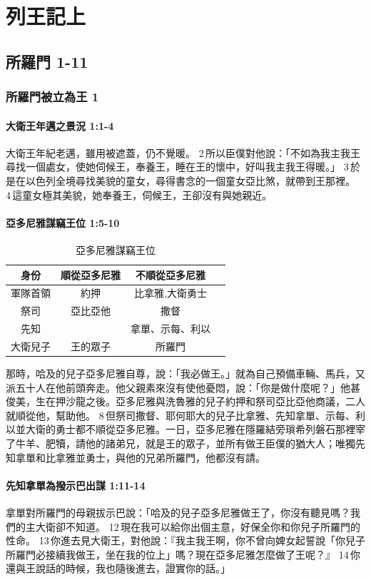 \chapter{列王記上}
\section{所羅門 1-11}


\subsection{所羅門被立為王 1}
\subsubsection{大衛王年邁之景況 1:1-4}
大衛王年紀老邁，雖用被遮蓋，仍不覺暖。 2 所以臣僕對他說：「不如為我主我王尋找一個處女，使她伺候王，奉養王，睡在王的懷中，好叫我主我王得暖。」 3 於是在以色列全境尋找美貌的童女，尋得書念的一個童女亞比煞，就帶到王那裡。 4 這童女極其美貌，她奉養王，伺候王，王卻沒有與她親近。

\subsubsection{亞多尼雅謀竊王位 1:5-10}
\begin{table}
\vspace*{-5mm}
\centering
\begin{tabular}{|c|c|c|c|}\hline\hline
身份 &順從亞多尼雅    &不順從亞多尼雅\\\hline\hline
軍隊首領&約押 &比拿雅,大衛勇士 \\\hline
祭司   &亞比亞他&撒督 \\\hline
先知& &拿單、示每、利以  \\\hline
大衛兒子 &王的眾子&所羅門\\\hline
\end{tabular}
\caption{亞多尼雅謀竊王位}
\end{table}
那時，哈及的兒子亞多尼雅自尊，說：「我必做王。」就為自己預備車輛、馬兵，又派五十人在他前頭奔走。他父親素來沒有使他憂悶，說：「你是做什麼呢？」他甚俊美，生在押沙龍之後。亞多尼雅與洗魯雅的兒子約押和祭司亞比亞他商議，二人就順從他，幫助他。 8 但祭司撒督、耶何耶大的兒子比拿雅、先知拿單、示每、利以並大衛的勇士都不順從亞多尼雅。一日，亞多尼雅在隱羅結旁瑣希列磐石那裡宰了牛羊、肥犢，請他的諸弟兄，就是王的眾子，並所有做王臣僕的猶大人；唯獨先知拿單和比拿雅並勇士，與他的兄弟所羅門，他都沒有請。

\subsubsection{先知拿單為撥示巴出謀 1:11-14}
拿單對所羅門的母親拔示巴說：「哈及的兒子亞多尼雅做王了，你沒有聽見嗎？我們的主大衛卻不知道。 12 現在我可以給你出個主意，好保全你和你兒子所羅門的性命。 13 你進去見大衛王，對他說：『我主我王啊，你不曾向婢女起誓說「你兒子所羅門必接續我做王，坐在我的位上」嗎？現在亞多尼雅怎麼做了王呢？』 14 你還與王說話的時候，我也隨後進去，證實你的話。」

